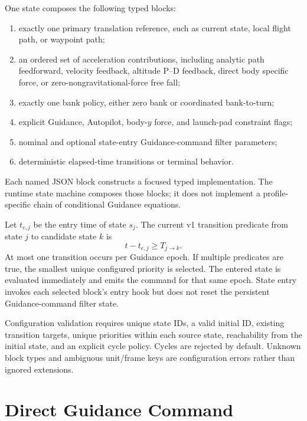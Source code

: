 One state composes the following typed blocks:
\begin{enumerate}
    \item exactly one primary translation reference, such as current state,
          local flight path, or waypoint path;
    \item an ordered set of acceleration contributions, including analytic
          path feedforward, velocity feedback, altitude P--D feedback, direct
          body specific force, or zero-nongravitational-force free fall;
    \item exactly one bank policy, either zero bank or coordinated
          bank-to-turn;
    \item explicit Guidance, Autopilot, body-$y$ force, and launch-pad
          constraint flags;
    \item nominal and optional state-entry Guidance-command filter parameters;
    \item deterministic elapsed-time transitions or terminal behavior.
\end{enumerate}
Each named JSON block constructs a focused typed implementation. The runtime
state machine composes those blocks; it does not implement a profile-specific
chain of conditional Guidance equations.

Let $t_{e,j}$ be the entry time of state $s_j$. The current v1 transition
predicate from state $j$ to candidate state $k$ is
\begin{equation}
t-t_{e,j}\ge T_{j\rightarrow k}.
\label{eq:elapsed_state_transition}
\end{equation}
At most one transition occurs per Guidance epoch. If multiple predicates are
true, the smallest unique configured priority is selected. The entered state
is evaluated immediately and emits the command for that same epoch. State
entry invokes each selected block's entry hook but does not reset the
persistent Guidance-command filter state.

Configuration validation requires unique state IDs, a valid initial ID,
existing transition targets, unique priorities within each source state,
reachability from the initial state, and an explicit cycle policy. Cycles are
rejected by default. Unknown block types and ambiguous unit/frame keys are
configuration errors rather than ignored extensions.

\section{Direct Guidance Command}

